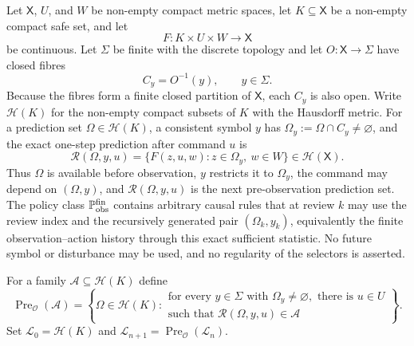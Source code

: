 \documentclass[11pt]{article}
\theoremstyle{definition}
\newcommand{\Pre}{\operatorname{Pre}}
\begin{document}
Let $\mathsf X$, $U$, and $W$ be non-empty compact metric spaces, let $K\subseteq \mathsf X$ be a non-empty compact safe set, and let
\[
F:K\times U\times W\longrightarrow \mathsf X
\]
be continuous. Let $\Sigma$ be finite with the discrete topology and let $O:\mathsf X\to \Sigma$ have closed fibres
\[
C_y=O^{-1}(y),\qquad y\in \Sigma.
\]
Because the fibres form a finite closed partition of $\mathsf X$, each $C_y$ is also open. Write $\mathcal H(K)$ for the non-empty compact subsets of $K$ with the Hausdorff metric. For a prediction set $\Omega\in\mathcal H(K)$, a consistent symbol $y$ has $\Omega_y:=\Omega\cap C_y\ne\varnothing$, and the exact one-step prediction after command $u$ is
\[
\mathscr R(\Omega,y,u)
 =\{F(z,u,w):z\in\Omega_y,\ w\in W\}\in\mathcal H(\mathsf X).
\]
Thus $\Omega$ is available before observation, $y$ restricts it to $\Omega_y$, the command may depend on $(\Omega,y)$, and $\mathscr R(\Omega,y,u)$ is the next pre-observation prediction set. The policy class $\mathbb P_{\rm obs}^{\rm fin}$ contains arbitrary causal rules that at review $k$ may use the review index and the recursively generated pair $(\Omega_k,y_k)$, equivalently the finite observation--action history through this exact sufficient statistic. No future symbol or disturbance may be used, and no regularity of the selectors is asserted.

For a family $\mathcal A\subseteq\mathcal H(K)$ define
\begin{equation}
\Pre_{\mathcal O}(\mathcal A)
=\left\{\Omega\in\mathcal H(K):
\begin{array}{l}
\text{for every }y\in \Sigma\text{ with }\Omega_y\ne\varnothing,\text{ there is }u\in U\\[-1mm]
\text{such that }\mathscr R(\Omega,y,u)\in\mathcal A
\end{array}\right\}.
\label{eq:finite-observation-predecessor}
\end{equation}
Set $\mathcal L_0=\mathcal H(K)$ and $\mathcal L_{n+1}=\Pre_{\mathcal O}(\mathcal L_n)$.
\end{document}
